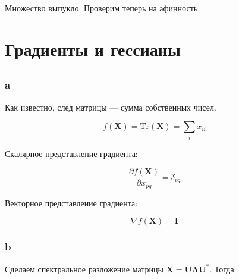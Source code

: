 	Множество выпукло. Проверим теперь на афинность
	
	\subsection{}
	
	\subsection{}
	
	\subsection{}
	
	\section{Градиенты и гессианы}
	
	\subsection{}
	
	\subsubsection{a}
	
	Как известно, след матрицы --- сумма собственных чисел.
	
	\begin{equation}
	f(\mathbf{X}) = \text{Tr} (\mathbf{X}) = \sum_i x_{ii}
	\end{equation}
	
	Скалярное представление градиента:
	
	\begin{equation}
	\frac{\partial f(\mathbf{X}) }{\partial x_{pq}}  = \delta_{pq} 
	\end{equation}
	
	Векторное представление градиента:
	
	\begin{equation}
	\nabla f(\mathbf{X}) = \mathbf{I}
	\end{equation}
	
	\subsubsection{b}
	
	Сделаем спектральное разложение матрицы $\mathbf{X} = \mathbf{U} \mathbf{\Lambda} \mathbf{U^*}$. Тогда
	
